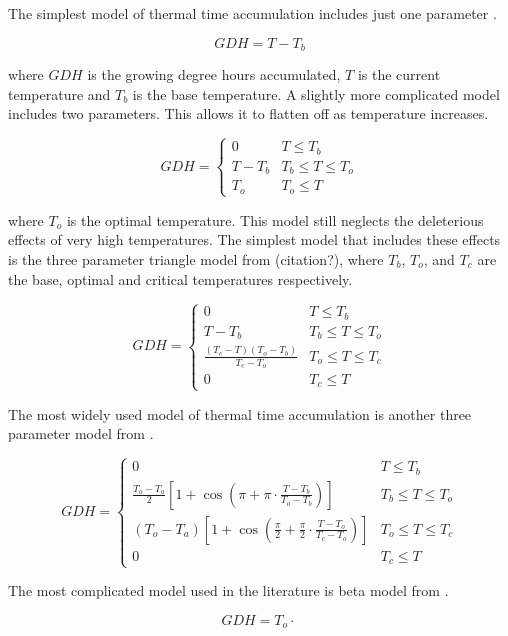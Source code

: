 \documentclass{amsart}
\begin{document}
The simplest model of thermal time accumulation includes just one parameter \citet{yang995}.

\[ GDH = T - T_b\]

where $GDH$ is the growing degree hours accumulated, $T$ is the current temperature and $T_b$ is the base temperature. A slightly more complicated model includes two parameters. This allows it to flatten off as temperature increases. 

\[ GDH = \begin{cases} 
      0 & T\leq T_b \\
      T - T_b & T_b\leq T\leq T_o \\
      T_o & T_o\leq T 
   \end{cases}
\]

where $T_o$ is the optimal temperature. This model still neglects the deleterious effects of very high temperatures.  The simplest model that includes these effects is the three parameter triangle model from (citation?), where $T_b$, $T_o$, and $T_c$ are the base, optimal and critical temperatures respectively.

\[ GDH = \begin{cases} 
      0 & T\leq T_b \\
      T - T_b & T_b \leq T \leq T_o \\
     \frac{(T_c - T) (T_o - T_b)}{T_c - T_o} & T_o\leq T \leq T_c \\
      0 & T_c \leq T
   \end{cases}\]


The most widely used model of thermal time accumulation is another three parameter model from \citet{anderson1985}.

\[ GDH = \begin{cases} 
      0 & T\leq T_b \\
      \frac{T_o-T_a}{2} \left[1+\cos\left(\pi + \pi \cdot \frac{T-T_b}{T_o-T_b}\right) \right] & T_b\leq T\leq T_o \\
     (T_o-T_a) \left[1+\cos\left(\frac{\pi}{2} + \frac{\pi}{2} \cdot \frac{T-T_o}{T_c-T_o}\right) \right] & T_o\leq T \leq T_c \\
      0 & T_c \leq T
   \end{cases}\]



The most complicated model used in the literature is beta model from \citet{marra2001}.

\[GDH = T_o \cdot \frac{}{}\]
\end{document}
